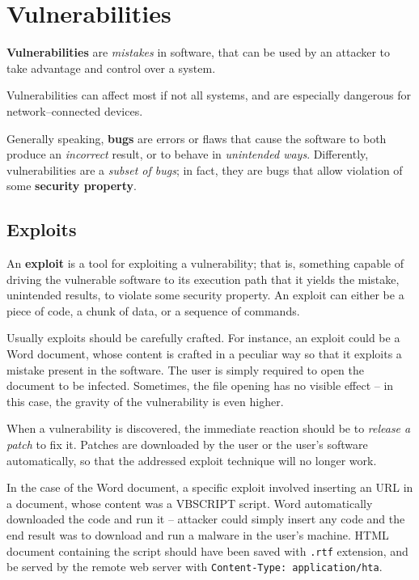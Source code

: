 \documentclass[10pt]{extbook}
\begin{document}
\section{Vulnerabilities}

\textbf{Vulnerabilities} are \emph{mistakes} in software, that can be used by
an attacker to take advantage and control over a system.

Vulnerabilities can affect most if not all systems, and are especially
dangerous for network--connected devices.

Generally speaking, \textbf{bugs} are errors or flaws that cause the software
to both produce an \emph{incorrect} result, or to behave in \emph{unintended
ways}. Differently, vulnerabilities are a \emph{subset of bugs}; in fact, they
are bugs that allow violation of some \textbf{security property}.

\subsection{Exploits}

An \textbf{exploit} is a tool for exploiting a vulnerability; that is,
something capable of driving the vulnerable software to its execution path that
it yields the mistake, unintended results, to violate some security property.
An exploit can either be a piece of code, a chunk of data, or a sequence of
commands.

Usually exploits should be carefully crafted. For instance, an exploit could be
a Word document, whose content is crafted in a peculiar way so that it exploits
a mistake present in the software. The user is simply required to open the
document to be infected. Sometimes, the file opening has no visible effect --
in this case, the gravity of the vulnerability is even higher.

When a vulnerability is discovered, the immediate reaction should be to
\emph{release a patch} to fix it. Patches are downloaded by the user or the
user's software automatically, so that the addressed exploit technique will no
longer work.

In the case of the Word document, a specific exploit involved inserting an URL
in a document, whose content was a VBSCRIPT script. Word automatically
downloaded the code and run it -- attacker could simply insert any code and the
end result was to download and run a malware in the user's machine. HTML document
containing the script should have been saved with \texttt{.rtf} extension, and
be served by the remote web server with \texttt{Content-Type: application/hta}.
\end{document}

